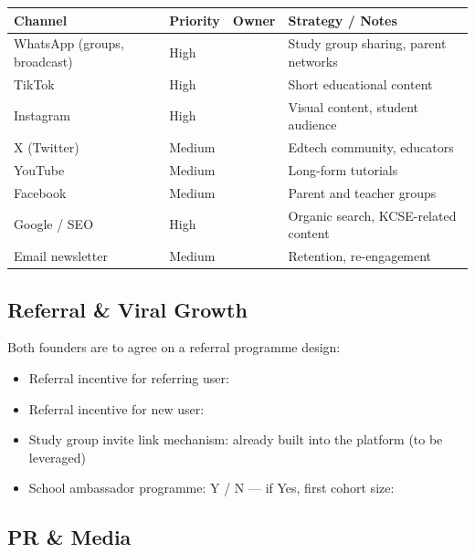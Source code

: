 \documentclass[12pt,a4paper]{article}
\newcommand{\blank}[1][5.5cm]{\underline{\hspace{#1}}}
\begin{document}
\begin{tabularx}{\linewidth}{L{3.5cm} C{2.5cm} L{3cm} X}
  \toprule
  \textbf{Channel} & \textbf{Priority} & \textbf{Owner} & \textbf{Strategy / Notes} \\
  \midrule
  WhatsApp (groups, broadcast) & High     & \blank[2.5cm] & Study group sharing, parent networks \\[0.3em]
  TikTok                       & High     & \blank[2.5cm] & Short educational content \\[0.3em]
  Instagram                    & High     & \blank[2.5cm] & Visual content, student audience \\[0.3em]
  X (Twitter)                  & Medium   & \blank[2.5cm] & Edtech community, educators \\[0.3em]
  YouTube                      & Medium   & \blank[2.5cm] & Long-form tutorials \\[0.3em]
  Facebook                     & Medium   & \blank[2.5cm] & Parent and teacher groups \\[0.3em]
  Google / SEO                 & High     & \blank[2.5cm] & Organic search, KCSE-related content \\[0.3em]
  Email newsletter             & Medium   & \blank[2.5cm] & Retention, re-engagement \\
  \bottomrule
\end{tabularx}

\subsection{Referral \& Viral Growth}

Both founders are to agree on a referral programme design:

\begin{itemize}
  \item Referral incentive for referring user: \blank[6cm]
  \item Referral incentive for new user: \blank[6cm]
  \item Study group invite link mechanism: already built into the platform (to be leveraged)
  \item School ambassador programme: Y \;/\; N --- if Yes, first cohort size: \blank[2cm]
\end{itemize}

\subsection{PR \& Media}
\end{document}
